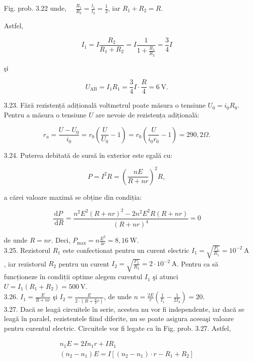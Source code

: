 \documentclass[10pt]{article}
\begin{document}
Fig. prob. 3.22 unde, $\quad \frac{R_{1}}{R_{2}}=\frac{l_{1}}{l_{2}}=\frac{1}{3}$, iar $R_{1}+R_{2}=R$.

Astfel,

$$
I_{1}=I \frac{R_{2}}{R_{1}+R_{2}}=I \frac{1}{1+\frac{R_{1}}{R_{2}}}=\frac{3}{4} I
$$

şi

$$
U_{\mathrm{AB}}=I_{1} R_{1}=\frac{3}{4} I \cdot \frac{R}{4}=6 \mathrm{~V} .
$$

3.23. Fără rezistență adițională voltmetrul poate măsura o tensiune $U_{0}=i_{0} R_{0}$. Pentru a măsura o tensiune $U$ are nevoie de rezistența adițională:

$$
r_{a}=\frac{U-U_{0}}{i_{0}}=r_{0}\left(\frac{U}{U_{0}}-1\right)=r_{0}\left(\frac{U}{i_{0} r_{0}}-1\right)=290,2 \Omega .
$$

3.24. Puterea debitată de sursă în exterior este egală cu:

$$
P=I^{2} R=\left(\frac{n E}{R+n r}\right)^{2} R,
$$

a cărei valoare maximă se obține din condiția:

$$
\frac{\mathrm{d} P}{\mathrm{~d} R}=\frac{n^{2} E^{2}(R+n r)^{2}-2 n^{2} E^{2} R(R+n r)}{(R+n r)^{4}}=0
$$

de unde $R=n r$. Deci, $P_{\max }=n \frac{E^{2}}{4 r}=8,16 \mathrm{~W}$.\\
3.25. Rezistorul $R_{1}$ este confectionat pentru un curent electric $I_{1}=\sqrt{\frac{P_{1}}{R_{1}}}=10^{-2} \mathrm{~A}$, iar rezistorul $R_{2}$ pentru un curent $I_{2}=\sqrt{\frac{P_{2}}{R_{2}}}=2 \cdot 10^{-2} \mathrm{~A}$. Pentru ca să funcționeze în condiții optime alegem curentul $I_{1}$ şi atunci $U=I_{1}\left(R_{1}+R_{2}\right)=500 \mathrm{~V}$.\\
3.26. $I_{1}=\frac{E}{R+n r}$ şi $I_{2}=\frac{E}{2 \cdot\left(R+\frac{n}{2} r\right)}$, de unde $n=\frac{2 E}{r}\left(\frac{1}{I_{1}}-\frac{1}{2 I_{2}}\right)=20$.\\
3.27. Dacă se leagă circuitele în serie, acestea nu vor fi independente, iar dacă se leagă în paralel, rezistentele fiind diferite, nu se poate asigura aceeaşi valoare pentru curentul electric. Circuitele vor fi legate ca în Fig. prob. 3.27. Astfel,

$$
\begin{gathered}
n_{1} E=2 I n_{1} r+I R_{1} \\
\left(n_{2}-n_{1}\right) E=I\left[\left(n_{2}-n_{1}\right) \cdot r-R_{1}+R_{2}\right]
\end{gathered}
$$
\end{document}
